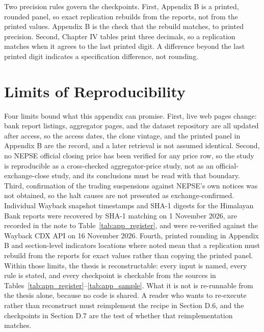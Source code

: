 Two precision rules govern the checkpoints. First, Appendix B is a printed, rounded panel, so exact replication rebuilds from the reports, not from the printed values. Appendix B is the check that the rebuild matches, to printed precision. Second, Chapter IV tables print three decimals, so a replication matches when it agrees to the last printed digit. A difference beyond the last printed digit indicates a specification difference, not rounding.

\section{Limits of Reproducibility}

Four limits bound what this appendix can promise. First, live web pages change: bank report listings, aggregator pages, and the dataset repository are all updated after access, so the access dates, the clone vintage, and the printed panel in Appendix B are the record, and a later retrieval is not assumed identical. Second, no NEPSE official closing price has been verified for any price row, so the study is reproducible as a cross-checked aggregator-price study, not as an official-exchange-close study, and its conclusions must be read with that boundary. Third, confirmation of the trading suspensions against NEPSE's own notices was not obtained, so the halt causes are not presented as exchange-confirmed. Individual Wayback snapshot timestamps and SHA-1 digests for the Himalayan Bank reports were recovered by SHA-1 matching on 1 November 2026, are recorded in the note to Table~\ref{tab:app_register}, and were re-verified against the Wayback CDX API on 16 November 2026. Fourth, printed rounding in Appendix B and section-level indicators locations where noted mean that a replication must rebuild from the reports for exact values rather than copying the printed panel. Within those limits, the thesis is reconstructable: every input is named, every rule is stated, and every checkpoint is checkable from the sources in Tables~\ref{tab:app_register}--\ref{tab:app_sample}. What it is not is re-runnable from the thesis alone, because no code is shared. A reader who wants to re-execute rather than reconstruct must reimplement the recipe in Section D.6, and the checkpoints in Section D.7 are the test of whether that reimplementation matches.
